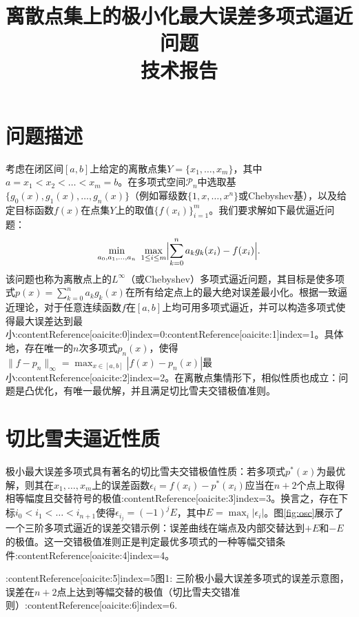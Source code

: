 \documentclass{article}
\begin{document}
\title{离散点集上的极小化最大误差多项式逼近问题\\技术报告}
\author{}
\date{}
\maketitle

\section{问题描述}
考虑在闭区间$[a,b]$上给定的离散点集$Y=\{x_1,\dots,x_m\}$，其中$a=x_1<x_2<\dots<x_m=b$。在多项式空间$\mathcal{P}_n$中选取基$\{g_0(x),g_1(x),\dots,g_n(x)\}$（例如幂级数$\{1,x,\dots,x^n\}$或Chebyshev基），以及给定目标函数$f(x)$在点集$Y$上的取值$\{f(x_i)\}_{i=1}^m$。我们要求解如下最优逼近问题：
\[
\min_{a_0,a_1,\dots,a_n}\ \max_{1\le i\le m}\Bigl|\sum_{k=0}^n a_k g_k(x_i)-f(x_i)\Bigr|.
\]
该问题也称为离散点上的$L^\infty$（或Chebyshev）多项式逼近问题，其目标是使多项式$p(x)=\sum_{k=0}^n a_k g_k(x)$在所有给定点上的最大绝对误差最小化。根据一致逼近理论，对于任意连续函数$f$在$[a,b]$上均可用多项式逼近，并可以构造多项式使得最大误差达到最小:contentReference[oaicite:0]{index=0}:contentReference[oaicite:1]{index=1}。具体地，存在唯一的$n$次多项式$p_n(x)$，使得$\|f-p_n\|_\infty=\max_{x\in[a,b]}|f(x)-p_n(x)|$最小:contentReference[oaicite:2]{index=2}。在离散点集情形下，相似性质也成立：问题是凸优化，有唯一最优解，并且满足切比雪夫交错极值准则。

\section{切比雪夫逼近性质}
极小最大误差多项式具有著名的切比雪夫交错极值性质：若多项式$p^*(x)$为最优解，则其在$x_1,\dots,x_m$上的误差函数$\epsilon_i=f(x_i)-p^*(x_i)$应当在$n+2$个点上取得相等幅度且交替符号的极值:contentReference[oaicite:3]{index=3}。换言之，存在下标$i_0<i_1<\dots<i_{n+1}$使得$\epsilon_{i_j}=(-1)^j E$，其中$E=\max_i|\epsilon_i|$。图\ref{fig:osc}展示了一个三阶多项式逼近的误差交错示例：误差曲线在端点及内部交替达到$+E$和$-E$的极值。这一交错极值准则正是判定最优多项式的一种等幅交错条件:contentReference[oaicite:4]{index=4}。 

:contentReference[oaicite:5]{index=5}图1: 三阶极小最大误差多项式的误差示意图，误差在$n+2$点上达到等幅交替的极值（切比雪夫交错准则）:contentReference[oaicite:6]{index=6}.
\end{document}
